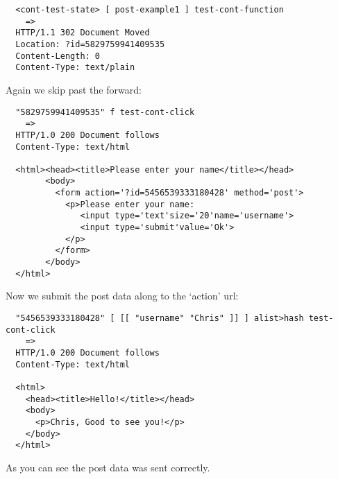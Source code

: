 \begin{verbatim}
  <cont-test-state> [ post-example1 ] test-cont-function
    =>
  HTTP/1.1 302 Document Moved
  Location: ?id=5829759941409535
  Content-Length: 0
  Content-Type: text/plain
\end{verbatim}

Again we skip past the forward:

\begin{verbatim}
  "5829759941409535" f test-cont-click
    =>
  HTTP/1.0 200 Document follows
  Content-Type: text/html

  <html><head><title>Please enter your name</title></head>
        <body>
          <form action='?id=5456539333180428' method='post'>
            <p>Please enter your name:
               <input type='text'size='20'name='username'>
               <input type='submit'value='Ok'>
            </p>
          </form> 
        </body>
  </html>
\end{verbatim}

Now we submit the post data along to the `action' url:

\begin{verbatim}
  "5456539333180428" [ [[ "username" "Chris" ]] ] alist>hash test-cont-click
    =>
  HTTP/1.0 200 Document follows
  Content-Type: text/html

  <html>
    <head><title>Hello!</title></head>
    <body>
      <p>Chris, Good to see you!</p>
    </body>
  </html>
\end{verbatim}

As you can see the post data was sent correctly.
